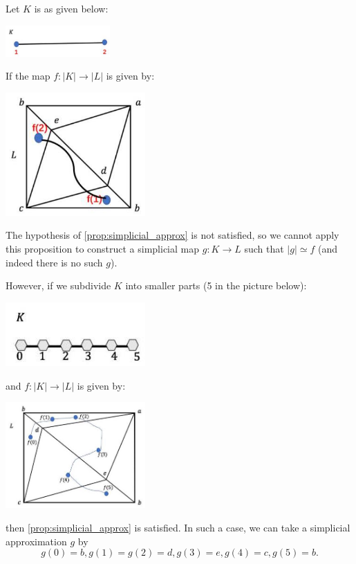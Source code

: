 \begin{example} 
Let $K$ is as given below:
\begin{center}
\includegraphics[width=0.3\textwidth]{images/Ch5_line_K.jpg}
\end{center}
If the map $f:|K| \to |L|$ is given by:
\begin{center}
\includegraphics[width=0.4\textwidth]{images/Ch5_no_simp_K.jpg}
\end{center}
\hspace*{3em} 
The hypothesis of \autoref{prop:simplicial_approx} is not satisfied, so we cannot apply this proposition to construct a simplicial map $g: K \to L$ such that $|g| \simeq f$ (and indeed there is no such $g$).

However, if we subdivide $K$ into smaller parts (5 in the picture below): 
\begin{center}
\includegraphics[width=0.4\textwidth]{images/Ch5_5_segments.jpg}
\end{center}
and $f:|K| \to |L|$ is given by:
\begin{center}
\includegraphics[width=0.4\textwidth]{images/Ch5_example_simplicial_approx.jpg}
\end{center}
then \autoref{prop:simplicial_approx} is satisfied. In such a case, 
we can take a simplicial approximation \(g\) by
\[
g\left( 0\right)  = b, g\left( 1\right)  = g\left( 2\right)  = d, g\left( 3\right)  = e, g\left( 4\right)  = c, g\left( 5\right)  = b.
\]
\end{example}

